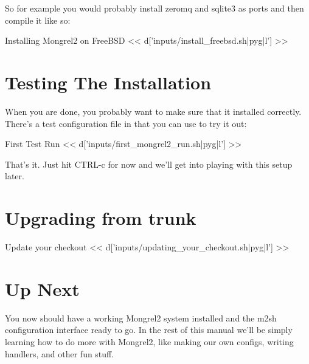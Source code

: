 So for example you would probably install zeromq and sqlite3 as ports and then compile it like so:

\begin{code}{Installing Mongrel2 on FreeBSD}
<< d['inputs/install_freebsd.sh|pyg|l'] >>
\end{code}

\section{Testing The Installation}

When you are done, you probably want to make sure that it installed correctly.
There's a test configuration file in  that you can
use to try it out:

\begin{code}{First Test Run}
<< d['inputs/first_mongrel2_run.sh|pyg|l'] >>
\end{code}

That's it.  Just hit CTRL-c for now and we'll get into playing with this
setup later.

\section{Upgrading from trunk}
\begin{code}{Update your checkout}
<< d['inputs/updating_your_checkout.sh|pyg|l'] >>
\end{code}



\section{Up Next}

You now should have a working Mongrel2 system installed and the m2sh configuration
interface ready to go.  In the rest of this manual we'll be simply learning how
to do more with Mongrel2, like making our own configs, writing handlers, and other
fun stuff.


